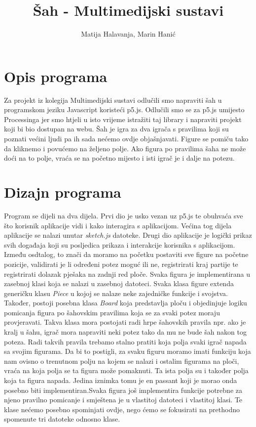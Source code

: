 \documentclass[11pt]{article}
\begin{document}
\author{Matija Halavanja, Marin Hanić}
\title{Šah - Multimedijski sustavi}
\maketitle
\tableofcontents

\section{Opis programa}
Za projekt iz kolegija Multimedijski sustavi odlučili smo napraviti šah u programskom jeziku Javascript koristeći p5.js.
Odlučili smo se za p5.js umijesto Processinga jer smo htjeli u isto vrijeme istražiti taj library i napraviti projekt koji
bi bio dostupan na webu. Šah je igra za dva igrača s pravilima koji su poznati većini ljudi pa ih sada nećemo ovdje objašnjavati.
Figure se pomiču tako da kliknemo i povućemo na željeno polje. Ako figura po pravilima šaha ne može doći na to polje, vraća se na
početno mijesto i isti igrač je i dalje na potezu.

\section{Dizajn programa}
Program se dijeli na dva dijela. Prvi dio je usko vezan uz p5.js te obuhvaća sve što korisnik aplikacije vidi i kako
interagira s aplikacijom. Većina tog dijela aplikacije se nalazi unutar \textit{sketch.js} datoteke. Drugi dio aplikacije je logički prikaz
svih događaja koji su posljedica prikaza i interakcije korisnika s aplikacijom. Između osdtalog, to znači da moramo na početku 
postaviti sve figure na početne pozicije, validirati je li određeni potez moguć ili ne, registrirati kraj partije te
registrirati dolazak pješaka na zadnji red ploče. Svaka figura je implementirana u zasebnoj klasi koja se nalazi u zasebnoj datoteci.
Svaka klasa figure extenda generičku klasu \textit{Piece} u kojoj se nalaze neke zajedničke funkcije i svojstva. Također, postoji posebna
klasa \textit{Board} koja predstavlja ploču i objedinjuje logiku pomicanja figura po šahovskim pravilima koja se za svaki potez moraju
provjeravati. Takva klasa mora postojati radi hrpe šahovskih pravila npr. ako je kralj u šahu, igrač mora napraviti neki potez tako da mu ne
bude šah nakon tog poteza. Radi takvih pravila trebamo stalno pratiti koja polja svaki igrač napada sa svojim figurama. Da bi to postigli,
za svaku figuru moramo imati funkciju koja nam ovisno o trenutnom polju na kojem se nalazi i ostalim figurama na ploči, vraća na koja polja
se ta figura može pomaknuti. Ta ista polja su i također polja koja ta figura napada. Jedina iznimka tomu je en passant koji je morao onda posebno
biti implementiran.Svaka figura još implementira funkcije potrebne za njeno pravilno pomicanje i smještena je u vlastitoj datoteci i vlastitoj klasi.
Te klase nećemo posebno spominjati ovdje, nego ćemo se fokusirati na prethodno spomenute tri datoteke odnosno klase.
\end{document}
